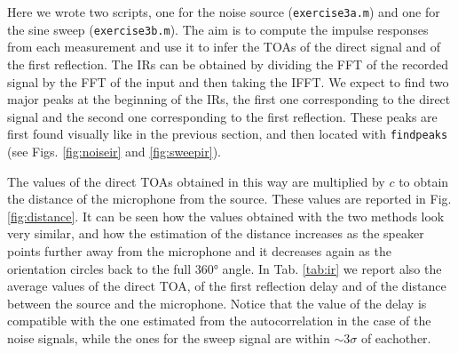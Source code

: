 \documentclass[a4paper]{article}
\begin{document}
Here we wrote two scripts, one for the noise source (\verb|exercise3a.m|) and one for the sine sweep (\verb|exercise3b.m|). The aim is to compute the impulse responses from each measurement and use it to infer the TOAs of the direct signal and of the first reflection. The IRs can be obtained by dividing the FFT of the recorded signal by the FFT of the input and then taking the IFFT. We expect to find two major peaks at the beginning of the IRs, the first one corresponding to the direct signal and the second one corresponding to the first reflection. These peaks are first found visually like in the previous section, and then located with \verb|findpeaks| (see Figs. \ref{fig:noiseir} and \ref{fig:sweepir}).

The values of the direct TOAs obtained in this way are multiplied by $c$ to obtain the distance of the microphone from the source. These values are reported in Fig. \ref{fig:distance}.  It can be seen how the values obtained with the two methods look very similar, and how the estimation of the distance increases as the speaker points further away from the microphone and it decreases again as the orientation circles back to the full 360° angle. In Tab. \ref{tab:ir} we report also the average values of the direct TOA, of the first reflection delay and of the distance between the source and the microphone. Notice that the value of the delay is compatible with the one estimated from the autocorrelation in the case of the noise signals, while the ones for the sweep signal are within $\sim 3\sigma $ of eachother.
\end{document}
